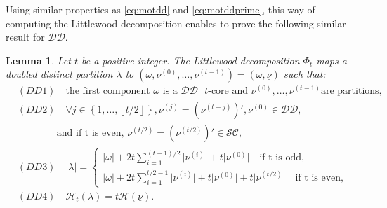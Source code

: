 \documentclass[11pt,letterpaper]{amsart}
\def\cch{\mathcal H}
\def\ccsc{\mathcal {SC}}
\def\ccdd{\mathcal {DD}}
\newtheorem{lm}[df]{Lemma}
\numberwithin{equation}{section}
\numberwithin{df}{section}
\begin{document}
Using similar properties as \eqref{eq:motdd} and \eqref{eq:motddprime}, this way of computing the Littlewood decomposition enables to prove the following similar result for $\ccdd$.
\begin{lm}\cite[Lemma 4.3]{MP}\label{lem:DDLittlewood}
Let $t$ be a positive integer. The Littlewood decomposition $\Phi_t$ maps a doubled distinct partition $\lambda$ to $\left(\omega,\nu^{(0)},\dots,\nu^{(t-1)}\right)=(\omega,\underline{\nu})$ such that:
\begin{align*}
&(DD1)\quad \text{the first component } \omega \text{ is a $\ccdd$ $t$-core and }\nu^{(0)},\dots,\nu^{(t-1)} \text{are partitions},\\
&(DD2) \quad \forall j \in \left\lbrace 1,\dots,\left\lfloor t/2 \right\rfloor\right\rbrace, \nu^{(j)}=\left(\nu^{(t-j)}\right)',\nu^{(0)}\in\ccdd,
\\&\quad \quad\quad \quad \text{and if t is even, } \nu^{\left(t/2\right)}=\left(\nu^{\left(t/2\right)}\right)'\in\ccsc,\\
&(DD3) \quad |\lambda|=\begin{cases}\displaystyle|\omega|+2t\sum_{i=1}^{(t-1)/2} \lvert\nu^{(i)}\rvert +t\lvert \nu^{(0)}\rvert\quad
 \text{if t is odd},\\
\displaystyle|\omega|+2t\sum_{i=1}^{t/2-1} \lvert\nu^{(i)}\rvert+t\lvert \nu^{(0)}\rvert+t\lvert \nu^{\left(t/2\right)}\rvert \quad \text{if t is even},
\end{cases}\\
&(DD4)\quad \mathcal{H}_t(\lambda)=t\mathcal{H}(\underline{\nu}).
\end{align*}
\end{lm}
\end{document}
